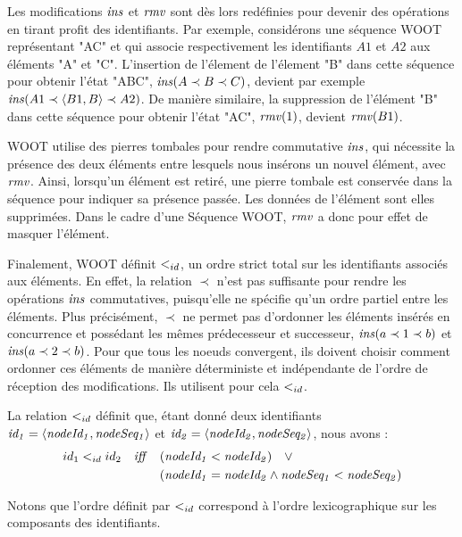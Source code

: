 Les modifications $\mathit{ins}$ et $\mathit{rmv}$ sont dès lors redéfinies pour devenir des opérations en tirant profit des identifiants.
Par exemple, considérons une séquence WOOT représentant "AC" et qui associe respectivement les identifiants $A1$ et $A2$ aux éléments "A" et "C".
L'insertion de l'élement de l'élement "B" dans cette séquence pour obtenir l'état "ABC", \ie $\mathit{ins}(A \prec B \prec C)$, devient par exemple $\mathit{ins}(A1 \prec \langle B1,B \rangle \prec A2)$.
De manière similaire, la suppression de l'élément "B" dans cette séquence pour obtenir l'état "AC", \ie $\mathit{rmv}(1)$, devient $\mathit{rmv}(B1)$.

WOOT utilise des pierres tombales pour rendre commutative $\mathit{ins}$, qui nécessite la présence des deux éléments entre lesquels nous insérons un nouvel élément, avec $\mathit{rmv}$.
Ainsi, lorsqu'un élément est retiré, une pierre tombale est conservée dans la séquence pour indiquer sa présence passée.
Les données de l'élément sont elles supprimées.
Dans le cadre d'une Séquence WOOT, $\mathit{rmv}$ a donc pour effet de masquer l'élément.

Finalement, WOOT définit $<_{id}$, un ordre strict total sur les identifiants associés aux éléments.
En effet, la relation $\prec$ n'est pas suffisante pour rendre les opérations $\mathit{ins}$ commutatives, puisqu'elle ne spécifie qu'un ordre partiel entre les éléments.
Plus précisément, $\prec$ ne permet pas d'ordonner les éléments insérés en concurrence et possédant les mêmes prédecesseur et successeur, \eg $\mathit{ins}(a \prec 1 \prec b)$ et $\mathit{ins}(a \prec 2 \prec b)$.
Pour que tous les noeuds convergent, ils doivent choisir comment ordonner ces éléments de manière déterministe et indépendante de l'ordre de réception des modifications.
Ils utilisent pour cela $<_{id}$.
\begin{definition}
  La relation $<_{id}$ définit que, étant donné deux identifiants $\mathit{id_1} = \langle \mathit{nodeId_1},\mathit{nodeSeq_1} \rangle$ et $\mathit{id_2} = \langle \mathit{nodeId_2},\mathit{nodeSeq_2} \rangle$, nous avons :
  \begin{equation*}
    \begin{split}
      id_1 <_{id} id_2 \quad \mathit{iff} \quad  & (\mathit{nodeId_1} < \mathit{nodeId_2}) \quad \lor \\
                                            & (\mathit{nodeId_1} = \mathit{nodeId_2} \land \mathit{nodeSeq_1} < \mathit{nodeSeq_2}) \\
    \end{split}
  \end{equation*}
\end{definition}
Notons que l'ordre définit par $<_{id}$ correspond à l'ordre lexicographique sur les composants des identifiants.

